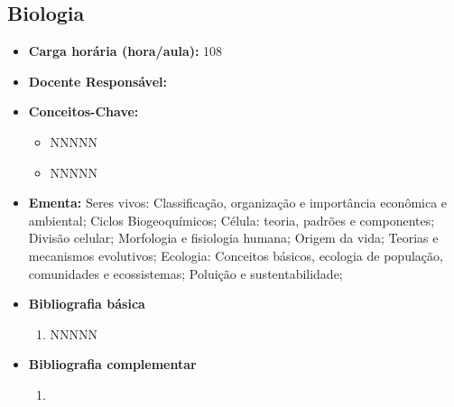 \documentclass[11pt,fleqn]{book} %
\begin{document}
\subsection{Biologia}\label{disc:biologia}
\begin{itemize}
	\item \textbf{Carga horária (hora/aula):} 108
	\item \textbf{Docente Responsável:}
	\item \textbf{Conceitos-Chave:}
	\begin{itemize}
		\item NNNNN
		\item NNNNN
	\end{itemize}
	\item \textbf{Ementa:} Seres vivos: Classificação, organização e importância econômica e ambiental;
	Ciclos Biogeoquímicos; 
	Célula: teoria, padrões e componentes; 
	Divisão celular;
	Morfologia e fisiologia humana;
	Origem da vida; 
	Teorias e mecanismos evolutivos;
	Ecologia: Conceitos básicos, ecologia de população, comunidades e ecossistemas; 
	Poluição e sustentabilidade;
	
	\item \textbf{Bibliografia básica}
	\begin{enumerate}
		\item NNNNN
	\end{enumerate}
	\item \textbf{Bibliografia complementar}
	\begin{enumerate}
		\item 
	\end{enumerate}	
\end{itemize}



\newpage
\end{document}
